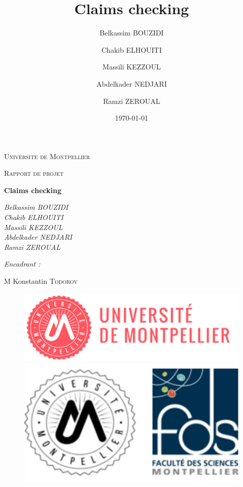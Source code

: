 \documentclass[oneside,13pt,a4paper]{report}
\title{Claims checking}
\author{
    Belkassim BOUZIDI \and
    Chakib ELHOUITI \and
    Massili KEZZOUL \and
    Abdelkader NEDJARI \and
    Ramzi ZEROUAL
}
\date{\today}
\begin{document}
\begin{titlepage}
	\centering
	{\scshape\LARGE Universite de Montpellier\par}
	{\scshape\Large Rapport de projet\par}
	\vspace{1.5cm}
	{\huge\bfseries Claims checking\par}
	\vspace{2cm}
	{\Large\itshape
		Belkassim BOUZIDI \\
		Chakib ELHOUITI \\
		Massili KEZZOUL \\
		Abdelkader NEDJARI \\
		Ramzi ZEROUAL \\
		\par}

	\vspace{1.5cm}

	{\Large\itshape
		Encadrant :\par
		M Konstantin \textsc{Todorov}
		\par}

	\vspace{2cm}

	\begin{figure}[h]
		\begin{minipage}[c]{.46\linewidth}
			\centering
			\includegraphics[width=1\textwidth]{img/univ-montpellier.png}
		\end{minipage}
		\hfill%
		\begin{minipage}[c]{.46\linewidth}
			\centering
			\includegraphics[width=1\textwidth]{img/fds.png}
		\end{minipage}
	\end{figure}


\end{titlepage}
\end{document}
